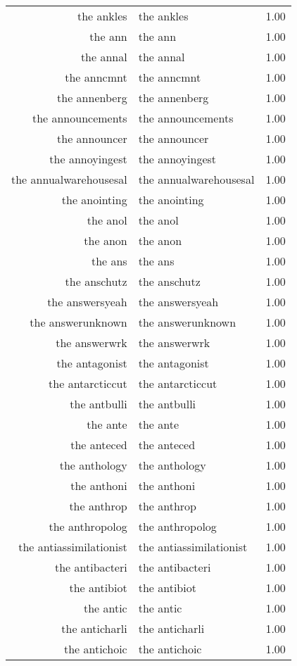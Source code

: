 \begin{table}[ht]
\begin{tabular}{rlr}
  the ankles & the ankles & 1.00 \\ 
  the ann & the ann & 1.00 \\ 
  the annal & the annal & 1.00 \\ 
  the anncmnt & the anncmnt & 1.00 \\ 
  the annenberg & the annenberg & 1.00 \\ 
  the announcements & the announcements & 1.00 \\ 
  the announcer & the announcer & 1.00 \\ 
  the annoyingest & the annoyingest & 1.00 \\ 
  the annualwarehousesal & the annualwarehousesal & 1.00 \\ 
  the anointing & the anointing & 1.00 \\ 
  the anol & the anol & 1.00 \\ 
  the anon & the anon & 1.00 \\ 
  the ans & the ans & 1.00 \\ 
  the anschutz & the anschutz & 1.00 \\ 
  the answersyeah & the answersyeah & 1.00 \\ 
  the answerunknown & the answerunknown & 1.00 \\ 
  the answerwrk & the answerwrk & 1.00 \\ 
  the antagonist & the antagonist & 1.00 \\ 
  the antarcticcut & the antarcticcut & 1.00 \\ 
  the antbulli & the antbulli & 1.00 \\ 
  the ante & the ante & 1.00 \\ 
  the anteced & the anteced & 1.00 \\ 
  the anthology & the anthology & 1.00 \\ 
  the anthoni & the anthoni & 1.00 \\ 
  the anthrop & the anthrop & 1.00 \\ 
  the anthropolog & the anthropolog & 1.00 \\ 
  the antiassimilationist & the antiassimilationist & 1.00 \\ 
  the antibacteri & the antibacteri & 1.00 \\ 
  the antibiot & the antibiot & 1.00 \\ 
  the antic & the antic & 1.00 \\ 
  the anticharli & the anticharli & 1.00 \\ 
  the antichoic & the antichoic & 1.00 \\ 

\end{tabular}
\end{table}
